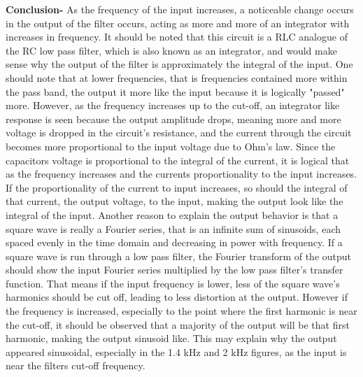 \documentclass[12pt]{article}
\begin{document}
\textbf{Conclusion-} As the frequency of the input increases, a noticeable change occurs in the output of the filter occurs, acting as more and more of an integrator with increases in frequency. It should be noted that this circuit is a RLC analogue of the RC low pass filter, which is also known as an integrator, and would make sense why the output of the filter is approximately the integral of the input. One should note that at lower frequencies, that is frequencies contained more within the pass band, the output it more like the input because it is logically "passed" more. However, as the frequency increases up to the cut-off, an integrator like response is seen because the output amplitude drops, meaning more and more voltage is dropped in the circuit's resistance, and the current through the circuit becomes more proportional to the input voltage due to Ohm's law. Since the capacitors voltage is proportional to the integral of the current, it is logical that as the frequency increases and the currents proportionality to the input increases. If the proportionality of the current to input increases, so should the integral of that current, the output voltage, to the input, making the output look like the integral of the input. Another reason to explain the output behavior is that a square wave is really a Fourier series, that is an infinite sum of sinusoids, each spaced evenly in the time domain and decreasing in power with frequency. If a square wave is run through a low pass filter, the Fourier transform of the output should show the input Fourier series multiplied by the low pass filter's transfer function. That means if the input frequency is lower, less of the square wave's harmonics should be cut off, leading to less distortion at the output. However if the frequency is increased, especially to the point where the first harmonic is near the cut-off, it should be observed that a majority of the output will be that first harmonic, making the output sinusoid like. This may explain why the output appeared sinusoidal, especially in the 1.4 kHz and 2 kHz figures, as the input is near the filters cut-off frequency.
\end{document}

